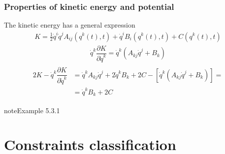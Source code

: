 \documentclass[letterpaper,10pt,english]{jupyterBook}
\begin{document}
\subsubsection{Properties of kinetic energy and potential}
\label{\detokenize{ch/lagrange-t-explicit:properties-of-kinetic-energy-and-potential}}
\sphinxAtStartPar
The kinetic energy has a general expression
\begin{equation*}
\begin{split}K = \frac{1}{2} \dot{q}^i \dot{q}^j A_{ij}\left(q^k(t),t\right) + \dot{q}^i B_{i}\left(q^k(t),t\right) + C\left(q^k(t),t\right)\end{split}
\end{equation*}\begin{equation*}
\begin{split}\dot{q}^k \dfrac{\partial K}{\partial \dot{q}^k} = \dot{q}^k \left( A_{kj} \dot{q}^j + B_k \right)\end{split}
\end{equation*}\begin{equation*}
\begin{split}\begin{aligned}
  2K - \dot{q}^k \dfrac{\partial K}{\partial \dot{q}^k}
  & = \dot{q}^k A_{kj} \dot{q}^j + 2 \dot{q}^k B_k + 2 C - \left[ \dot{q}^k \left( A_{kj} \dot{q}^j + B_k \right) \right] = \\
  & = \dot{q}^k B_k + 2 C
\end{aligned}\end{split}
\end{equation*}\label{ch/lagrange-t-explicit:example-0}
\begin{sphinxadmonition}{note}{Example 5.3.1}


\end{sphinxadmonition}

\sphinxstepscope


\section{Constraints classification}
\label{\detokenize{ch/lagrange-constraints:constraints-classification}}\label{\detokenize{ch/lagrange-constraints:classical-mechanics-lagrange-constraints}}\label{\detokenize{ch/lagrange-constraints::doc}}
\end{document}
